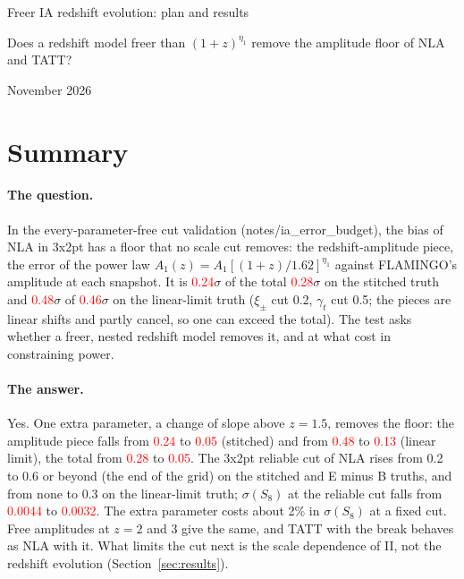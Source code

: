 \documentclass[11pt]{article}
\newif\ifnumbersfinal
\newcommand{\refresh}[1]{\ifnumbersfinal#1\else\textcolor{red}{#1}\fi}
\newcommand{\FobS}{\refresh{0.28}}
\newcommand{\FobL}{\refresh{0.46}}
\newcommand{\AmpS}{\refresh{0.24}}
\newcommand{\AmpL}{\refresh{0.48}}
\newcommand{\BkFobS}{\refresh{0.05}}      %
\newcommand{\BkAmpS}{\refresh{0.05}}      %
\newcommand{\BkAmpL}{\refresh{0.13}}      %
\newcommand{\SigNLA}{\refresh{0.0044}}    %
\newcommand{\SigBkSix}{\refresh{0.0032}}  %
\newcommand{\Zb}{1.5}
\begin{document}
\begin{center}
  {\LARGE Freer IA redshift evolution: plan and results\par}
  \vspace{0.6em}
  {\large Does a redshift model freer than $(1+z)^{\eta_1}$ remove the amplitude floor of NLA and TATT?\par}
  \vspace{0.6em}
  {\large November 2026\par}
\end{center}
\vspace{1em}

\section{Summary}

\paragraph{The question.}
In the every-parameter-free cut validation (notes/ia\_error\_budget), the
bias of NLA in 3x2pt has a floor that no scale cut removes: the
redshift-amplitude piece, the error of the power law $A_1(z) = A_1
[(1+z)/1.62]^{\eta_1}$ against FLAMINGO's amplitude at each snapshot. It is
\AmpS$\sigma$ of the total \FobS$\sigma$ on the stitched truth and \AmpL$\sigma$
of \FobL$\sigma$ on the linear-limit truth ($\xi_\pm$ cut 0.2, $\gamma_t$ cut
0.5; the pieces are linear shifts and partly cancel, so one can exceed the
total). The test asks whether a freer, nested redshift model removes it, and at
what cost in constraining power.

\paragraph{The answer.}
Yes. One extra parameter, a change of slope above $z = \Zb$, removes the
floor: the amplitude piece falls from \AmpS{} to \BkAmpS{} (stitched) and
from \AmpL{} to \BkAmpL{} (linear limit), the total from \FobS{} to
\BkFobS. The 3x2pt reliable cut of NLA rises from 0.2 to 0.6 or beyond
(the end of the grid) on the stitched and E minus B truths, and from none
to 0.3 on the linear-limit truth; $\sigma(S_8)$ at the reliable cut falls
from \SigNLA{} to \SigBkSix. The extra parameter costs about 2\% in
$\sigma(S_8)$ at a fixed cut. Free amplitudes at $z = 2$ and 3 give the
same, and TATT with the break behaves as NLA with it. What limits the cut
next is the scale dependence of II, not the redshift evolution
(Section~\ref{sec:results}).
\end{document}
